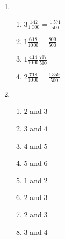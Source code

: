 \begin{solutions}{}
{\begin{enumerate}[itemsep=5pt, label=\textbf{\arabic*}. ]
    \begin{enumerate}[noitemsep, label=\textbf{(\alph*)} ] 
    \item $2,82843$%
    \item $27,71281$ - irrational %
    \item $10,00000$ - rational 
    \item $0,70000$ - rational  %
    \item $0,04000$ - rational %
    \item $0,500000$ - rational  %
    \item $6,00000$ - rational  %
    \item $44,27189$ - irrational  %
    \item $0,06000$ - rational n %
    \item $-8(0,2) = -4,00000$ - rational  %
    \item $44,72136$ - irrational %
    \end{enumerate}
\item %

\begin{enumerate}[noitemsep, label=\textbf{(\alph*)} ] 
\item $3 \frac{142}{1~000} =\frac{1~571}{500}$
\item $1\frac{618}{1000}=\frac{809}{500}$
\item $1\frac{414}{1000}\frac{707}{500}$
\item $2\frac{718}{1000}=\frac{1~359}{500}$
    \end{enumerate}


\item %

    \begin{enumerate}[noitemsep, label=\textbf{(\alph*)} ] 
\item $2$ and $3$
\item $3$ and $4$
\item $4$ and $5$
\item $5$ and $6$
\item $1$ and $2$
\item $2$ and $3$
\item $2$ and $3$
\item $3$ and $4$
    \end{enumerate}



\end{enumerate}}
\end{solutions}
